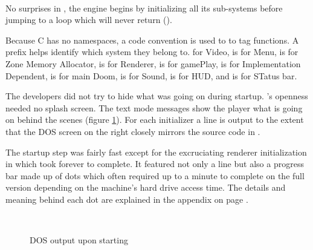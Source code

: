 \\
\par
{}
\par
No surprises in , the engine begins by initializing all its sub-systems before jumping to a loop which will never return ().\\
\par
Because C has no namespaces, a code convention is used to to tag functions. A prefix helps identify which system they belong to.  for Video,  is for Menu,  is for Zone Memory Allocator,  is for Renderer,  is for gamePlay,  is for Implementation Dependent,  is for main Doom,  is for Sound,  is for HUD, and  is for STatus bar.\\
\par
The developers did not try to hide what was going on during startup. \doom's openness needed no splash screen. The text mode messages show the player what is going on behind the scenes (figure \ref{dosloading}). For each initializer a line is output to the extent that the DOS screen on the right closely mirrors the source code in .\\
\par
The startup step was fairly fast except for the excruciating renderer initialization in  which took forever to complete. It featured not only a line but also a progress bar made up of dots which often required up to a minute to complete on the full version depending on the machine's hard drive access time. The details and meaning behind each dot are explained in the appendix on page \pageref{dots_explained}.\\
\par
{}\\
\begin{figure}[H]
\caption{DOS output upon starting }
\label{dosloading}
\end{figure}

